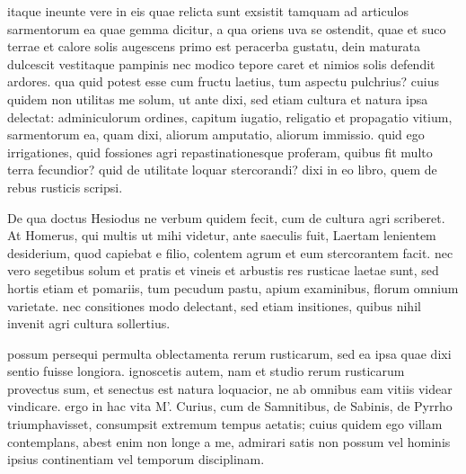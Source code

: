  itaque ineunte vere in eis quae relicta sunt exsistit tamquam ad articulos sarmentorum ea quae gemma dicitur, a qua oriens uva se ostendit, quae et suco terrae et calore solis augescens primo est peracerba gustatu, dein maturata dulcescit vestitaque pampinis nec modico tepore caret et nimios solis defendit ardores. qua quid potest esse cum fructu laetius, tum aspectu pulchrius? cuius quidem non utilitas me solum, ut ante dixi, sed etiam cultura et natura ipsa delectat: adminiculorum ordines, capitum iugatio, religatio et propagatio vitium, sarmentorum ea, quam dixi, aliorum amputatio, aliorum immissio. quid ego irrigationes, quid fossiones agri repastinationesque proferam, quibus fit multo terra fecundior? quid de utilitate loquar stercorandi? dixi in eo libro, quem de rebus rusticis scripsi.

 De qua doctus Hesiodus ne verbum quidem fecit, cum de cultura agri scriberet. At Homerus, qui multis ut mihi videtur, ante saeculis fuit, Laertam lenientem desiderium, quod capiebat e filio, colentem agrum et eum stercorantem facit. nec vero segetibus solum et pratis et vineis et arbustis res rusticae laetae sunt, sed hortis etiam et pomariis, tum pecudum pastu, apium examinibus, florum omnium varietate. nec consitiones modo delectant, sed etiam insitiones, quibus nihil invenit agri cultura sollertius.

 possum persequi permulta oblectamenta rerum rusticarum, sed ea ipsa quae dixi sentio fuisse longiora. ignoscetis autem, nam et studio rerum rusticarum provectus sum, et senectus est natura loquacior, ne ab omnibus eam vitiis videar vindicare. ergo in hac vita M'. Curius, cum de Samnitibus, de Sabinis, de Pyrrho triumphavisset, consumpsit extremum tempus aetatis; cuius quidem ego villam contemplans, abest enim non longe a me, admirari satis non possum vel hominis ipsius continentiam vel temporum disciplinam.

